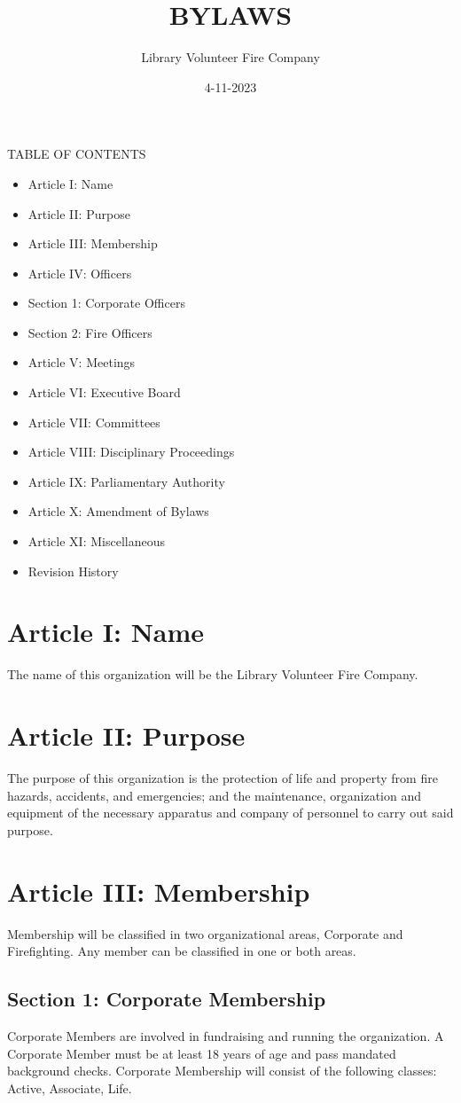 ﻿\documentclass[12pt,letterpaper]{article}
\title{BYLAWS}
\author{Library Volunteer Fire Company}
\date{4-11-2023}
\begin{document}
\maketitle
\newpage

TABLE OF CONTENTS
\begin{itemize}
\item Article I: Name
\item Article II: Purpose
\item Article III: Membership
\item Article IV: Officers
\item Section 1: Corporate Officers
\item Section 2: Fire Officers
\item Article V: Meetings
\item Article VI: Executive Board
\item Article VII: Committees
\item Article VIII: Disciplinary Proceedings
\item Article IX: Parliamentary Authority
\item Article X: Amendment of Bylaws
\item Article XI: Miscellaneous
\item Revision History
\end{itemize}
\newpage

\section*{Article I: Name}
The name of this organization will be the Library Volunteer Fire Company.

\section*{Article II: Purpose}
The purpose of this organization is the protection of life and property from fire hazards, accidents, and emergencies; and the maintenance, organization and equipment of the necessary apparatus and company of personnel to carry out said purpose.

\section*{Article III: Membership}
Membership will be classified in two organizational areas, Corporate and Firefighting.  Any member can be classified in one or both areas.

\subsection*{Section 1: Corporate Membership}
Corporate Members are involved in fundraising and running the organization.  A Corporate Member must be at least 18 years of age and pass mandated background checks.  Corporate Membership will consist of the following classes: Active, Associate, Life.
\end{document}
